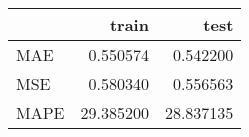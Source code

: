 \begin{tabular}{lrr}
\toprule
{} &      train &       test \\
\midrule
MAE  &   0.550574 &   0.542200 \\
MSE  &   0.580340 &   0.556563 \\
MAPE &  29.385200 &  28.837135 \\
\bottomrule
\end{tabular}

